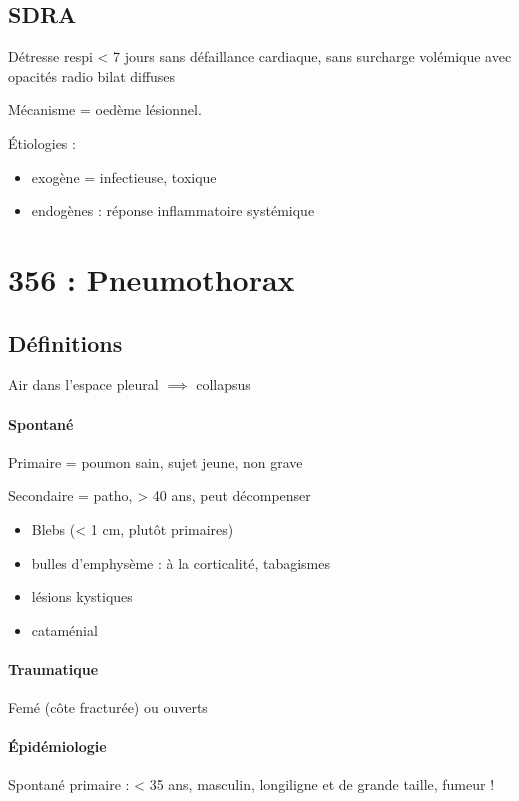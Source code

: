 \documentclass{article}
\begin{document}
\subsection{SDRA}
Détresse respi < 7 jours sans défaillance cardiaque, sans surcharge volémique
avec opacités radio bilat diffuses

Mécanisme = oedème lésionnel.

Étiologies :
\begin{itemize}
\item exogène = infectieuse, toxique
\item endogènes : réponse inflammatoire systémique
\end{itemize}

\section{356 : Pneumothorax}%

\subsection{Définitions}
Air dans l'espace pleural $\implies$ collapsus 

\paragraph{Spontané}
Primaire = poumon sain, sujet jeune, non grave

Secondaire = patho, > 40 ans, peut décompenser

\begin{itemize}
\item Blebs (< 1 cm, plutôt primaires)
\item bulles d'emphysème : à la corticalité, tabagismes
\item lésions kystiques
\item cataménial
\end{itemize}

\paragraph{Traumatique}
Femé (côte fracturée) ou ouverts

\paragraph{Épidémiologie}
Spontané primaire : < 35 ans, masculin, longiligne et de grande taille, fumeur !
\end{document}
